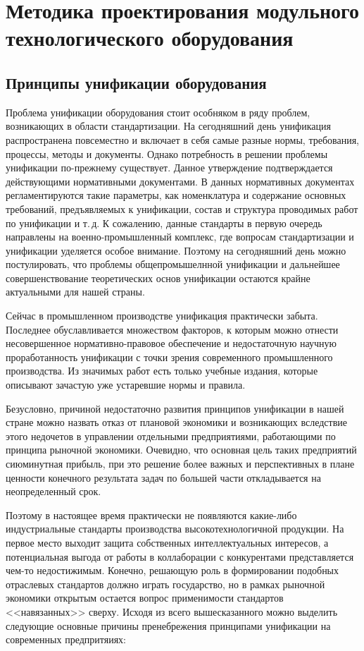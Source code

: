 \chapter{Методика проектирования модульного технологического оборудования}\label{ch:ch2}

\section{Принципы унификации оборудования}

Проблема унификации оборудования стоит особняком в ряду проблем, возникающих в области стандартизации. На сегодняшний день унификация распространена повсеместно и включает в себя самые разные нормы, требования, процессы, методы и документы. Однако потребность в решении проблемы унификации по-прежнему существует. Данное утверждение подтверждается действующими нормативными документами. В данных нормативных документах регламентируются такие параметры, как номенклатура и содержание основных требований, предъявляемых к унификации, состав и структура проводимых работ по унификации и т.\,д. К сожалению, данные стандарты в первую очередь направлены на военно-промышленный комплекс, где вопросам стандартизации и унификации уделяется особое внимание. Поэтому на сегодняшний день можно постулировать, что проблемы общепромышелнной унификации и дальнейшее совершенствование теоретических основ унификации остаются крайне актуальными для нашей страны. 

Сейчас в промышленном производстве унификация практически забыта. Последнее обуславливается множеством факторов, к которым можно отнести несовершенное нормативно-правовое обеспечение и недостаточную научную проработанность унификации с точки зрения современного промышленного производства. Из значимых работ есть только учебные издания, которые описывают зачастую уже устаревшие нормы и правила. 

Безусловно, причиной недостаточно развития принципов унификации в нашей стране можно назвать отказ от плановой экономики и возникающих вследствие этого недочетов в управлении отдельными предприятиями, работающими по принципа рыночной экономики. Очевидно, что основная цель таких предприятий сиюминутная прибыль, при это решение более важных и перспективных в плане ценности конечного результата задач по большей части откладывается на неопределенный срок. 

Поэтому в настоящее время практически не появляются какие-либо индустриальные стандарты производства высокотехнологичной продукции. На первое место выходит защита собственных интеллектуальных интересов, а потенциальная выгода от работы в коллаборации с конкурентами представляется чем-то недостижимым. Конечно, решающую роль в формировании подобных отраслевых стандартов должно играть государство, но в рамках рыночной экономики открытым остается вопрос применимости стандартов <<навязанных>> сверху. Исходя из всего вышесказанного можно выделить следующие основные причины пренебрежения принципами унификации на современных предпритяиях:

